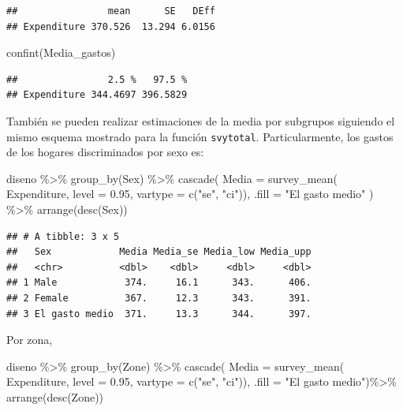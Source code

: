 \documentclass[
  12pt,
]{book}
\newenvironment{Shaded}{\begin{snugshade}}{\end{snugshade}}
\newcommand{\AttributeTok}[1]{\textcolor[rgb]{0.77,0.63,0.00}{#1}}
\newcommand{\FloatTok}[1]{\textcolor[rgb]{0.00,0.00,0.81}{#1}}
\newcommand{\FunctionTok}[1]{\textcolor[rgb]{0.00,0.00,0.00}{#1}}
\newcommand{\NormalTok}[1]{#1}
\newcommand{\SpecialCharTok}[1]{\textcolor[rgb]{0.00,0.00,0.00}{#1}}
\newcommand{\StringTok}[1]{\textcolor[rgb]{0.31,0.60,0.02}{#1}}
\begin{document}
\begin{verbatim}
##                mean      SE   DEff
## Expenditure 370.526  13.294 6.0156
\end{verbatim}

\begin{Shaded}
\begin{Highlighting}[]
\FunctionTok{confint}\NormalTok{(Media\_gastos)}
\end{Highlighting}
\end{Shaded}

\begin{verbatim}
##                2.5 %   97.5 %
## Expenditure 344.4697 396.5829
\end{verbatim}

También se pueden realizar estimaciones de la media por subgrupos siguiendo el mismo esquema mostrado para la función \texttt{svytotal}. Particularmente, los gastos de los hogares discriminados por sexo es:

\begin{Shaded}
\begin{Highlighting}[]
\NormalTok{diseno }\SpecialCharTok{\%\textgreater{}\%} \FunctionTok{group\_by}\NormalTok{(Sex) }\SpecialCharTok{\%\textgreater{}\%}
  \FunctionTok{cascade}\NormalTok{(}
    \AttributeTok{Media =} \FunctionTok{survey\_mean}\NormalTok{(}
\NormalTok{      Expenditure, }\AttributeTok{level =} \FloatTok{0.95}\NormalTok{,}
       \AttributeTok{vartype =}  \FunctionTok{c}\NormalTok{(}\StringTok{"se"}\NormalTok{, }\StringTok{"ci"}\NormalTok{)), }
        \AttributeTok{.fill =} \StringTok{"El gasto medio"}\NormalTok{  ) }\SpecialCharTok{\%\textgreater{}\%}
  \FunctionTok{arrange}\NormalTok{(}\FunctionTok{desc}\NormalTok{(Sex))}
\end{Highlighting}
\end{Shaded}

\begin{verbatim}
## # A tibble: 3 x 5
##   Sex            Media Media_se Media_low Media_upp
##   <chr>          <dbl>    <dbl>     <dbl>     <dbl>
## 1 Male            374.     16.1      343.      406.
## 2 Female          367.     12.3      343.      391.
## 3 El gasto medio  371.     13.3      344.      397.
\end{verbatim}

Por zona,

\begin{Shaded}
\begin{Highlighting}[]
\NormalTok{diseno }\SpecialCharTok{\%\textgreater{}\%} \FunctionTok{group\_by}\NormalTok{(Zone) }\SpecialCharTok{\%\textgreater{}\%}
  \FunctionTok{cascade}\NormalTok{(}
    \AttributeTok{Media =} \FunctionTok{survey\_mean}\NormalTok{(}
\NormalTok{      Expenditure, }\AttributeTok{level =} \FloatTok{0.95}\NormalTok{,}
       \AttributeTok{vartype =}  \FunctionTok{c}\NormalTok{(}\StringTok{"se"}\NormalTok{, }\StringTok{"ci"}\NormalTok{)), }
        \AttributeTok{.fill =} \StringTok{"El gasto medio"}\NormalTok{)}\SpecialCharTok{\%\textgreater{}\%}
  \FunctionTok{arrange}\NormalTok{(}\FunctionTok{desc}\NormalTok{(Zone))}
\end{Highlighting}
\end{Shaded}
\end{document}
